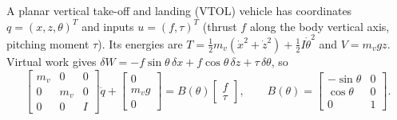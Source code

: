 \documentclass[11pt, a4paper]{article}
\theoremstyle{definition}
\theoremstyle{plain}
\begin{document}
A planar vertical take-off and landing (VTOL) vehicle has coordinates $q = (x, z, \theta)^T$ and inputs $u = (f, \tau)^T$ (thrust $f$ along the body vertical axis, pitching moment $\tau$). Its energies are $T = \frac{1}{2} m_v (\dot{x}^2 + \dot{z}^2) + \frac{1}{2} I \dot{\theta}^2$ and $V = m_v g z$. Virtual work gives $\delta W = -f\sin\theta\,\delta x + f\cos\theta\,\delta z + \tau\,\delta\theta$, so
\begin{equation}
  \begin{bmatrix} m_v & 0 & 0 \\ 0 & m_v & 0 \\ 0 & 0 & I \end{bmatrix} \ddot{q}
  + \begin{bmatrix} 0 \\ m_v g \\ 0 \end{bmatrix}
  = B(\theta) \begin{bmatrix} f \\ \tau \end{bmatrix}, \qquad
  B(\theta) = \begin{bmatrix} -\sin\theta & 0 \\ \cos\theta & 0 \\ 0 & 1 \end{bmatrix}.
  \label{eq:vtol}
\end{equation}
\end{document}
